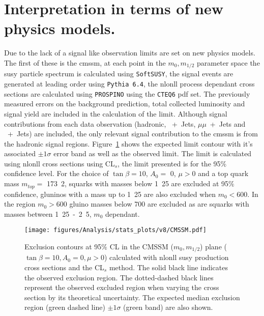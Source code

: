 \section{Interpretation in terms of new physics models.} %
\label{cha:interpretation_in_terms_of_new_physics_models_}
Due to the lack of a signal like observation limits are set on new physics models. The first of these is the \ac{cmssm}, at each point in the $m_{0}, m_{1/2}$ parameter space the \ac{susy} particle spectrum is calculated using \texttt{SoftSUSY}\cite{Allanach:2001kg}, the signal events are generated at leading order using \texttt{Pythia 6.4}\cite{pythia}, the \ac{nlonll} process dependant cross sections are calculated using \texttt{PROSPINO}\cite{Beenakker:1996ch} using the \texttt{CTEQ6}\cite{cteq6.1} \ac{pdf} set. The previously measured errors on the background prediction, total collected luminosity and signal yield are included in the calculation of the limit. Although signal contributions from each data observation (hadronic, \Pmu~+~Jets, $\mu\mu$~+~Jets and \Pphoton~+~Jets) are included, the only relevant signal contribution to the \ac{cmssm} is from the hadronic signal regions.
Figure~\ref{fig:cmssm-limit} shows the expected limit contour with it's associated $\pm1\sigma$ error band as well as the observed limit. The limit is calculated using \ac{nlonll} cross sections using CL$_s$\cite{cls-pdg}, the limit presented is for the 95$\%$ confidence level. For the choice of $\tan\beta = 10$, $A_0 = $ \unit{0}{\GeV}, $\mu > 0$ and a top quark mass $m_{top} = $ \unit{173.2}{\GeV}, squarks with masses below \unit{1.25}{\TeV} are excluded at 95$\%$ confidence, gluninos with a mass up to \unit{1.25}{\TeV} are also excluded when $m_{0} < $\unit{600}{\GeV}. In the region $m_{0} > $\unit{600}{\GeV} gluino masses below \unit{700}{\GeV} are excluded as are squarks with masses between \unit{1.25-2.5}{\TeV}, $m_{0}$ dependant.

\begin{figure}[h!]
  \begin{center}
    \texttt{[image: figures/Analysis/stats\_plots/v8/CMSSM.pdf]}
    \caption{\label{fig:cmssm-limit} Exclusion contours at 95$\%$ CL in
      the CMSSM ($m_0, m_{1/2}$) plane ($\tan \beta = 10, A_0 = 0, \mu
      > 0$) calculated with \ac{nlonll} \ac{susy} production cross sections and
      the CL$_{s}$ method. The solid black line indicates the observed
      exclusion region. The dotted-dashed black lines represent the
      observed excluded region when varying the cross section by its
      theoretical uncertainty. The expected median exclusion region
      (green dashed line) $\pm 1 \sigma$ (green band) are also shown.}
  \end{center}
\end{figure}


